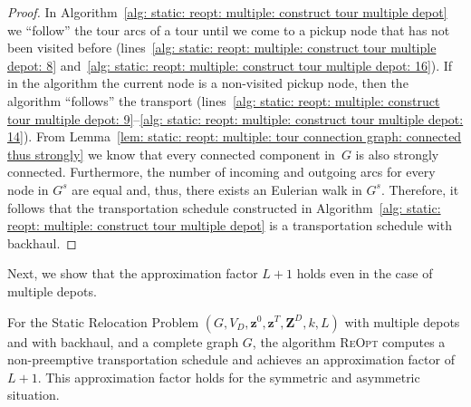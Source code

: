 \documentclass[english]{llncs}
\numberwithin{sublemma}{lemma}
\newcommand{\capd}{\ensuremath{L}}
\newcommand{\z}{\boldsymbol{z}}
\newcommand{\zd}{\boldsymbol{Z}^D} \newcommand{\zzd}{Z^D}
\newcommand{\REOPT}{\textsc{ReOpt}\xspace}
\newcommand{\VD}{V_D}
\begin{document}
\begin{proof}
In Algorithm~\ref{alg: static: reopt: multiple: construct tour multiple depot} we ``follow'' the tour arcs of a tour until we come to a pickup node that has not been visited before
(lines~\ref{alg: static: reopt: multiple: construct tour multiple depot: 8} and~\ref{alg: static: reopt: multiple: construct tour multiple depot: 16}).
If in the algorithm the current node is a non-visited pickup node, then the algorithm ``follows'' the transport
(lines~\ref{alg: static: reopt: multiple: construct tour multiple depot: 9}--\ref{alg: static: reopt: multiple: construct tour multiple depot: 14}).
From Lemma~\ref{lem: static: reopt: multiple: tour connection graph: connected thus strongly} we know that every connected component in~$G$ is also strongly connected.
Furthermore, the number of incoming and outgoing arcs for every node in $G^s$ are equal and, thus, there exists an Eulerian walk in $G^s$.
Therefore, it follows that the transportation schedule constructed in Algorithm~\ref{alg: static: reopt: multiple: construct tour multiple depot} is a transportation schedule with backhaul.
\end{proof}




Next, we show that the approximation factor $\capd + 1$ holds even in the case of multiple depots.


\begin{theorem}\label{thm: static: reopt: multiple: with backhaul: C plus 1}
For the Static Relocation Problem $(G, \VD, \z^0, \z^T, \zd, k, \capd)$ with multiple depots and with backhaul, and a complete graph $G$,
the algorithm \REOPT computes a non-preemptive transportation schedule and achieves an approximation factor of $\capd + 1$.
This approximation factor holds for the symmetric and asymmetric situation.
\end{theorem}
\end{document}
